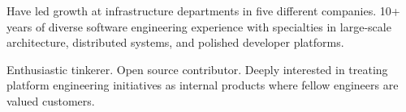 

\begin{cvparagraph}

Have led growth at infrastructure departments in five different companies. 10+ years of diverse software engineering experience with specialties in large-scale architecture, distributed systems, and polished developer platforms.

Enthusiastic tinkerer. Open source contributor. Deeply interested in treating platform engineering initiatives as internal products where fellow engineers are valued customers.
\end{cvparagraph}
